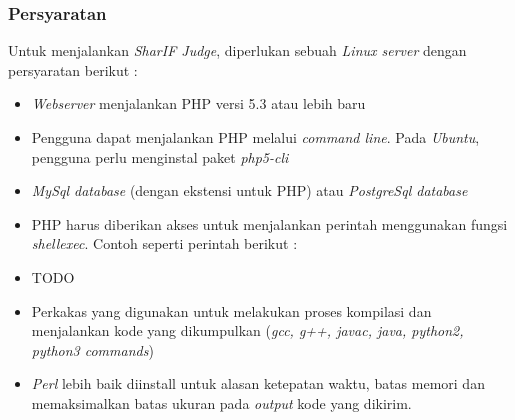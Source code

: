 \subsubsection{Persyaratan}
Untuk menjalankan \textit{SharIF Judge}, diperlukan sebuah \textit{Linux server} dengan persyaratan berikut :
\begin{itemize}
	\item \textit{Webserver} menjalankan PHP versi 5.3 atau lebih baru
	\item Pengguna dapat menjalankan PHP melalui \textit{command line}. Pada \textit{Ubuntu}, pengguna perlu menginstal paket \textit{php5-cli}
	\item \textit{MySql database} (dengan ekstensi untuk PHP) atau \textit{PostgreSql database}
	\item PHP harus diberikan akses untuk menjalankan perintah menggunakan fungsi \textit{shell\textunderscore exec}. Contoh seperti perintah berikut :
	\item TODO
	\item Perkakas yang digunakan untuk melakukan proses kompilasi dan menjalankan kode yang dikumpulkan (\textit{gcc, g++, javac, java, python2, python3 commands})
	\item \textit{Perl} lebih baik diinstall untuk alasan ketepatan waktu, batas memori dan memaksimalkan batas ukuran pada \textit{output} kode yang dikirim.
\end{itemize}

